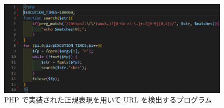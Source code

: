 \begin{figure}[tb]
    \centering
        \includegraphics[width=13.5cm,keepaspectratio]{figure/s-php.PNG}
        \caption{PHP で実装された正規表現を用いて URL を検出するプログラム}
        \label{fig:s-php}
\end{figure}
